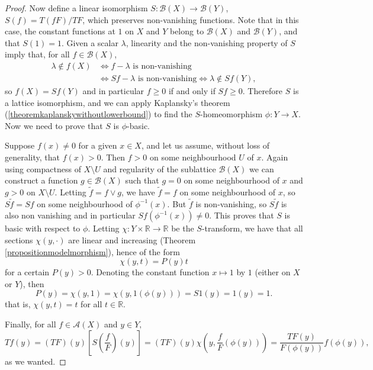 \begin{proof}
Now define a linear isomorphism $S:\mathcal{B}(X)\to\mathcal{B}(Y)$, $S(f)=T(fF)/TF$, which preserves non-vanishing functions. Note that in this case, the constant functions at $1$ on $X$ and $Y$ belong to $\mathcal{B}(X)$ and $\mathcal{B}(Y)$, and that $S(1)=1$. Given a scalar $\lambda$, linearity and the non-vanishing property of $S$ imply that, for all $f\in\mathcal{B}(X)$,
\begin{align*}
\lambda\not\in f(X)&\iff f-\lambda\text{ is non-vanishing}\\
&\iff Sf-\lambda\text{ is non-vanishing}\iff \lambda\not\in Sf(Y),
\end{align*}
so $f(X)=Sf(Y)$ and in particular $f\geq 0$ if and only if $Sf\geq 0$. Therefore $S$ is a lattice isomorphism, and we can apply Kaplansky's theorem (\ref{theoremkaplanskywithoutlowerbound}) to find the $S$-homeomorphism $\phi:Y\to X$. Now we need to prove that $S$ is $\phi$-basic.

Suppose $f(x)\neq 0$ for a given $x\in X$, and let us assume, without loss of generality, that $f(x)>0$. Then $f>0$ on some neighbourhood $U$ of $x$. Again using compactness of $X\setminus U$ and regularity of the sublattice $\mathcal{B}(X)$ we can construct a function $g\in\mathcal{B}(X)$ such that $g=0$ on some neighbourhood of $x$ and $g>0$ on $X\setminus U$. Letting $\widetilde{f}=f\lor g$, we have $\widetilde{f}=f$ on some neighbourhood of $x$, so $S\widetilde{f}=Sf$ on some neighbourhood of $\phi^{-1}(x)$. But $\widetilde{f}$ is non-vanishing, so $S\widetilde{f}$ is also non vanishing and in particular $Sf(\phi^{-1}(x))\neq 0$. This proves that $S$ is basic with respect to $\phi$. Letting $\chi:Y\times\mathbb{R}\to\mathbb{R}$ be the $S$-transform, we have that all sections $\chi(y,\cdot)$ are linear and increasing (Theorem \ref{propositionmodelmorphism}), hence of the form
\[\chi(y,t)=P(y)t\]
for a certain $P(y)>0$. Denoting the constant function $x\mapsto 1$ by $1$ (either on $X$ or $Y$), then
\[P(y)=\chi(y,1)=\chi(y,1(\phi(y)))=S1(y)=1(y)=1.\]
that is, $\chi(y,t)=t$ for all $t\in\mathbb{R}$.

Finally, for all $f\in\mathcal{A}(X)$ and $y\in Y,$
\[Tf(y)=(TF)(y)\left[S\left(\frac{f}{F}\right)(y)\right]=(TF)(y)\chi\left(y,\frac{f}{F}(\phi(y))\right)=\frac{TF(y)}{F(\phi(y))}f(\phi(y)),\]
as we wanted.\qedhere
\end{proof}


